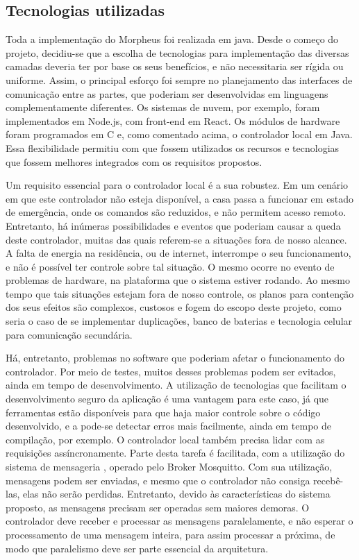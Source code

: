 \subsection{Tecnologias utilizadas}
Toda a implementação do Morpheus foi realizada em java. Desde o começo do projeto, decidiu-se que a escolha de tecnologias para implementação das diversas camadas deveria ter por base os seus benefícios, e não necessitaria ser rígida ou uniforme. Assim, o principal esforço foi sempre no planejamento das interfaces de comunicação entre as partes, que poderiam ser desenvolvidas em linguagens complementamente diferentes. Os sistemas de nuvem, por exemplo, foram implementados em Node.js, com front-end em React. Os módulos de hardware foram programados em C e, como comentado acima, o controlador local em Java.
Essa flexibilidade permitiu com que fossem utilizados os recursos e tecnologias que fossem melhores integrados com os requisitos propostos.

Um requisito essencial para o controlador local é a sua robustez. Em um cenário em que este controlador não esteja disponível, a casa passa a funcionar em estado de emergência, onde os comandos são reduzidos, e não permitem acesso remoto. Entretanto, há inúmeras possibilidades e eventos que poderiam causar a queda deste controlador, muitas das quais referem-se a situações fora de nosso alcance. A falta de energia na residência, ou de internet, interrompe o seu funcionamento, e não é possível ter controle sobre tal situação. O mesmo ocorre no evento de problemas de hardware, na plataforma que o sistema estiver rodando. Ao mesmo tempo que tais situações estejam fora de nosso controle, os planos para contenção dos seus efeitos são complexos, custosos e fogem do escopo deste projeto, como seria o caso de se implementar duplicações, banco de baterias e tecnologia celular para comunicação secundária.

Há, entretanto, problemas no software que poderiam afetar o funcionamento do controlador. Por meio de testes, muitos desses problemas podem ser evitados, ainda em tempo de desenvolvimento. A utilização de tecnologias que facilitam o desenvolvimento seguro da aplicação é uma vantagem para este caso, já que ferramentas estão disponíveis para que haja maior controle sobre o código desenvolvido, e a pode-se detectar erros mais facilmente, ainda em tempo de compilação, por exemplo.
O controlador local também precisa lidar com as requisições assíncronamente. Parte desta tarefa é facilitada, com a utilização do sistema de mensageria \wmqtt{}, operado pelo Broker Mosquitto. Com sua utilização, mensagens podem ser enviadas, e mesmo que o controlador não consiga recebê-las, elas não serão perdidas. Entretanto, devido às características do sistema proposto, as mensagens precisam ser operadas sem maiores demoras. O controlador deve receber e processar as mensagens paralelamente, e não esperar o processamento de uma mensagem inteira, para assim processar a próxima, de modo que paralelismo deve ser parte essencial da arquitetura.

